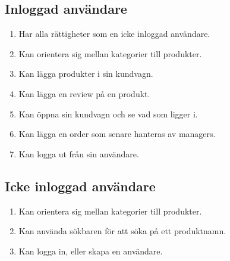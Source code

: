 \documentclass[a4paper]{article}
\begin{document}
\subsection{Inloggad användare}
\begin{enumerate}
  \item Har alla rättigheter som en icke inloggad användare.
  \item Kan orientera sig mellan kategorier till produkter.
  \item Kan lägga produkter i sin kundvagn.
  \item Kan lägga en review på en produkt.
  \item Kan öppna sin kundvagn och se vad som ligger i.
  \item Kan lägga en order som senare hanteras av managers.
  \item Kan logga ut från sin användare.
\end{enumerate}
%
\subsection{Icke inloggad användare}
\begin{enumerate}
  \item Kan orientera sig mellan kategorier till produkter.
  \item Kan använda sökbaren för att söka på ett produktnamn.
  \item Kan logga in, eller skapa en användare.
\end{enumerate}
%
\end{document}
